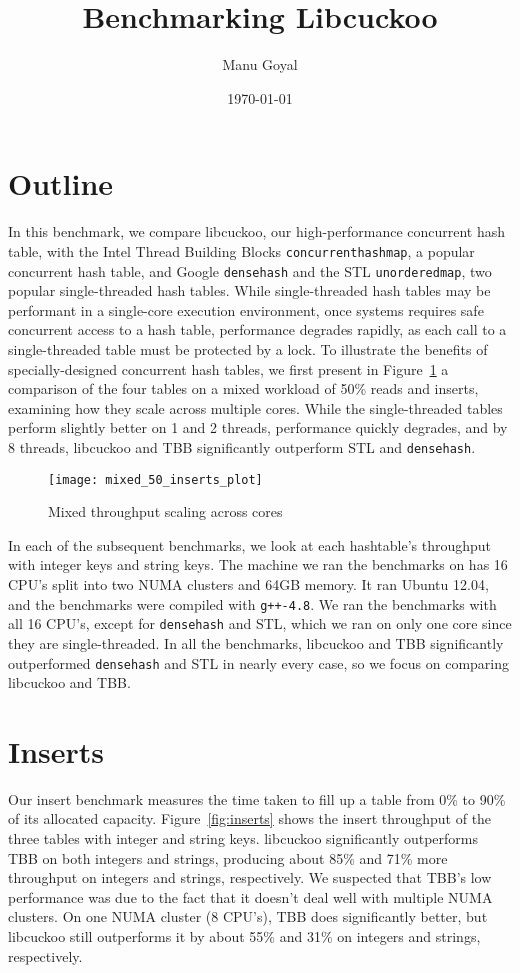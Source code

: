 \documentclass[12pt, letterpaper]{article}
\title{Benchmarking Libcuckoo}
\author{Manu Goyal}
\date{\today}
\newcommand{\myfigwidth}{0.9\textwidth}
\newcommand{\tbbmap}{\texttt{concurrent\textunderscore hash\textunderscore map}}
\newcommand{\densehash}{\texttt{dense\textunderscore hash}}
\newcommand{\unorderedmap}{\texttt{unordered\textunderscore map}}
\begin{document}
\maketitle

\section{Outline}
In this benchmark, we compare libcuckoo, our high-performance
concurrent hash table, with the Intel Thread Building Blocks
{\tbbmap}, a popular concurrent hash table, and Google {\densehash}
and the STL {\unorderedmap}, two popular single-threaded hash tables.
While single-threaded hash tables may be performant in a single-core
execution environment, once systems requires safe concurrent access to
a hash table, performance degrades rapidly, as each call to a
single-threaded table must be protected by a lock. To illustrate the
benefits of specially-designed concurrent hash tables, we first
present in Figure~\ref{fig:mixed-threads} a comparison of the four
tables on a mixed workload of 50\% reads and inserts, examining how
they scale across multiple cores. While the single-threaded tables
perform slightly better on 1 and 2 threads, performance quickly
degrades, and by 8 threads, libcuckoo and TBB significantly outperform
STL and {\densehash}.

\begin{figure}
  \centering
  \texttt{[image: mixed\_50\_inserts\_plot]}
  \caption{Mixed throughput scaling across cores}
  \label{fig:mixed-threads}
\end{figure}

In each of the subsequent benchmarks, we look at each hashtable's
throughput with integer keys and string keys. The machine we ran the
benchmarks on has 16 CPU's split into two NUMA clusters and 64GB
memory. It ran Ubuntu 12.04, and the benchmarks were compiled with
\texttt{g++-4.8}. We ran the benchmarks with all 16 CPU's, except for
{\densehash} and STL, which we ran on only one core since they are
single-threaded. In all the benchmarks, libcuckoo and TBB
significantly outperformed {\densehash} and STL in nearly every case,
so we focus on comparing libcuckoo and TBB.

\section{Inserts}
\label{sec:inserts}

Our insert benchmark measures the time taken to fill up a table from
0\% to 90\% of its allocated capacity. Figure~\ref{fig:inserts} shows
the insert throughput of the three tables with integer and string
keys. libcuckoo significantly outperforms TBB on both integers and
strings, producing about 85\% and 71\% more throughput on integers and
strings, respectively. We suspected that TBB's low performance was due
to the fact that it doesn't deal well with multiple NUMA clusters. On
one NUMA cluster (8 CPU's), TBB does significantly better, but
libcuckoo still outperforms it by about 55\% and 31\% on integers and
strings, respectively.
\end{document}
